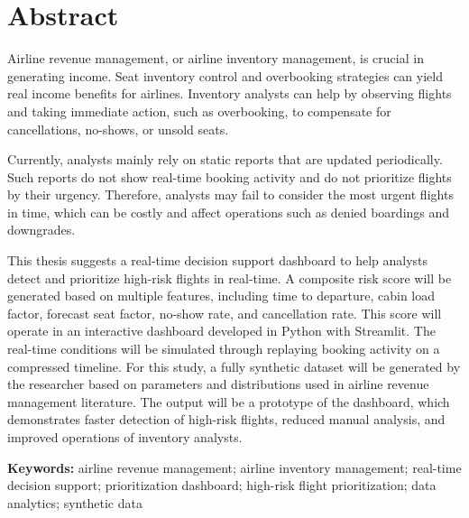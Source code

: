 \chapter*{Abstract}

Airline revenue management, or airline inventory management, is crucial in generating income. Seat inventory control and overbooking strategies can yield real income benefits for airlines. Inventory analysts can help by observing flights and taking immediate action, such as overbooking, to compensate for cancellations, no-shows, or unsold seats.

Currently, analysts mainly rely on static reports that are updated periodically. Such reports do not show real-time booking activity and do not prioritize flights by their urgency. Therefore, analysts may fail to consider the most urgent flights in time, which can be costly and affect operations such as denied boardings and downgrades.

This thesis suggests a real-time decision support dashboard to help analysts detect and prioritize high-risk flights in real-time. A composite risk score will be generated based on multiple features, including time to departure, cabin load factor, forecast seat factor, no-show rate, and cancellation rate. This score will operate in an interactive dashboard developed in Python with Streamlit. The real-time conditions will be simulated through replaying booking activity on a compressed timeline. For this study, a fully synthetic dataset will be generated by the researcher based on parameters and distributions used in airline revenue management literature. The output will be a prototype of the dashboard, which demonstrates faster detection of high-risk flights, reduced manual analysis, and improved operations of inventory analysts.

\vspace{1em}
\noindent\textbf{Keywords:} airline revenue management; airline inventory management; real-time decision support; prioritization dashboard; high-risk flight prioritization; data analytics; synthetic data

\clearpage
